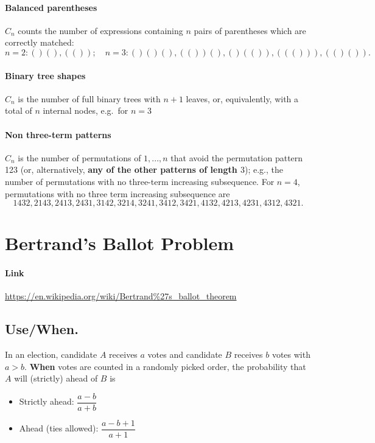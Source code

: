 \documentclass[11pt,A4,twoside]{article}
\let\oldsection\section
\renewcommand{\section}{\FloatBarrier\oldsection}
\let\oldsubsection\subsection
\renewcommand{\subsection}{\FloatBarrier\oldsubsection}
\numberwithin{equation}{section}
\theoremstyle{definition}
\theoremstyle{remark}
\begin{document}
\paragraph{Balanced parentheses} $C_n$ counts the number of expressions containing $n$ pairs of parentheses which are correctly matched:
$$ n = 2: ()(),(()); \quad n=3: ()()(),(())(),()(()),((())), (()()).$$

\paragraph{Binary tree shapes}  $C_n$ is the number of full binary trees with $n + 1$ leaves, or, equivalently, with a total of $n$ internal nodes, e.g.\ for $n=3$

\paragraph{Non three-term patterns} $C_n$ is the number of permutations of ${1, ..., n}$ that avoid the permutation pattern 123 (or, alternatively, \textbf{any of the other patterns of length $3$}); e.g., the number of permutations with no three-term increasing subsequence. For $n = 4$, permutations with no three term increasing subsequence are
$$ 1432, 2143, 2413, 2431, 3142, 3214, 3241, 3412, 3421, 4132, 4213, 4231, 4312, 4321.$$

\section{Bertrand’s Ballot Problem}
\paragraph{Link} \url{https://en.wikipedia.org/wiki/Bertrand%27s_ballot_theorem}

\subsection{Use/When.} In an election, candidate $A$ receives $a$ votes and candidate $B$ receives $b$ votes with $a>b$. \textbf{When} votes are counted in a randomly picked order, the probability that $A$ will (strictly) ahead of $B$ is
\begin{itemize}
    \item Strictly ahead: $\displaystyle \dfrac{a-b}{a+b}$
    \item Ahead (ties allowed): $\displaystyle \dfrac{a-b+1}{a+1}$
\end{itemize}
\end{document}
